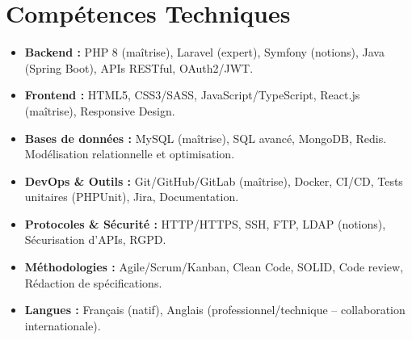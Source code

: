 \documentclass[a4paper,11pt]{article}
\begin{document}
\section{Compétences Techniques}
\begin{itemize}[leftmargin=*, nosep]
    \item \small{\textbf{Backend :} PHP 8 (maîtrise), Laravel (expert), Symfony (notions), Java (Spring Boot), APIs RESTful, OAuth2/JWT.}
    \item \small{\textbf{Frontend :} HTML5, CSS3/SASS, JavaScript/TypeScript, React.js (maîtrise), Responsive Design.}
    \item \small{\textbf{Bases de données :} MySQL (maîtrise), SQL avancé, MongoDB, Redis. Modélisation relationnelle et optimisation.}
    \item \small{\textbf{DevOps \& Outils :} Git/GitHub/GitLab (maîtrise), Docker, CI/CD, Tests unitaires (PHPUnit), Jira, Documentation.}
    \item \small{\textbf{Protocoles \& Sécurité :} HTTP/HTTPS, SSH, FTP, LDAP (notions), Sécurisation d'APIs, RGPD.}
    \item \small{\textbf{Méthodologies :} Agile/Scrum/Kanban, Clean Code, SOLID, Code review, Rédaction de spécifications.}
    \item \small{\textbf{Langues :} Français (natif), Anglais (professionnel/technique -- collaboration internationale).}
\end{itemize}

\end{document}
